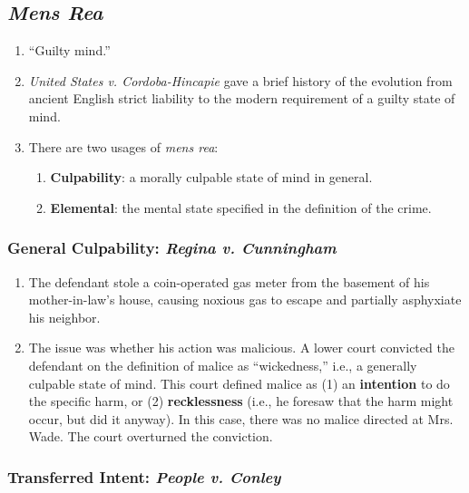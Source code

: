 \subsection{\emph{Mens Rea}}

\begin{enumerate}
    \item ``Guilty mind.''
    \item \emph{United States v. Cordoba-Hincapie} gave a brief history of the evolution from ancient English strict liability to the modern requirement of a guilty state of mind.
    \item There are two usages of \emph{mens rea}:
    \begin{enumerate}
        \item \textbf{Culpability}: a morally culpable state of mind in general.
        \item \textbf{Elemental}: the mental state specified in the definition of the crime.
    \end{enumerate}
\end{enumerate}

\subsubsection{General Culpability: \emph{Regina v. Cunningham}}

\begin{enumerate}
    \item The defendant stole a coin-operated gas meter from the basement of his mother-in-law's house, causing noxious gas to escape and partially asphyxiate his neighbor.
    \item The issue was whether his action was malicious. A lower court convicted the defendant on the definition of malice as ``wickedness,'' i.e., a generally culpable state of mind. This court defined malice as (1) an \textbf{intention} to do the specific harm, or (2) \textbf{recklessness} (i.e., he foresaw that the harm might occur, but did it anyway). In this case, there was no malice directed at Mrs. Wade. The court overturned the conviction.
\end{enumerate}

\subsubsection{Transferred Intent: \emph{People v. Conley}}

